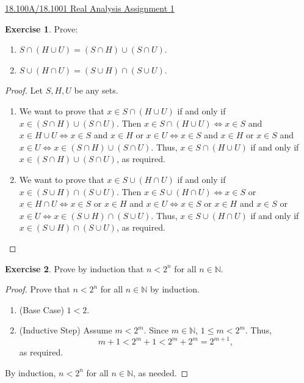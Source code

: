 \documentclass[12pt]{article}
\theoremstyle{definition}
\newtheorem{exercise}{Exercise}
\begin{document}
\uline{18.100A/18.1001 Real Analysis \hfill Assignment 1}

\begin{exercise}
    Prove:
    \begin{enumerate}[label=\alph*)]
        \item $S \cap (H \cup U) = (S \cap H) \cup (S \cap U)$.
        \item $S \cup (H \cap U) = (S \cup H) \cap (S \cup U)$.
    \end{enumerate}
\end{exercise}

\begin{proof}
    Let $S,H,U$ be any sets.
    \begin{enumerate}[label=\alph*)]
        \item We want to prove that $x \in S \cap (H \cup U)$ if and only if $x \in (S \cap H) \cup (S \cap U)$. Then $x \in S \cap (H \cup U) \iff x \in S$ and $x \in H \cup U \iff x \in S$ and $x \in H$ or $x \in U \iff x \in S$ and $x \in H$ or $x \in S$ and $x \in U \iff x \in (S \cap H) \cup (S \cap U)$. Thus, $x \in S \cap (H \cup U)$ if and only if $x \in (S \cap H) \cup (S \cap U)$, as required.
        \item We want to prove that $x \in S \cup (H \cap U)$ if and only if $x \in (S \cup H) \cap (S \cup U)$. Then $x \in S \cup (H \cap U) \iff x \in S$ or $x \in H \cap U \iff x \in S$ or $x \in H$ and $x \in U \iff x \in S$ or $x \in H$ and $x \in S$ or $x \in U \iff x \in (S \cup H) \cap (S \cup U)$. Thus, $x \in S \cup (H \cap U)$ if and only if $x \in (S \cup H) \cap (S \cup U)$, as required.
    \end{enumerate}
\end{proof}

\begin{exercise}
    Prove by induction that $n < 2^n$ for all $n \in \mathbb{N}$.
\end{exercise}

\begin{proof}
    Prove that $n < 2^n$ for all $n \in \mathbb{N}$ by induction.
    \begin{enumerate}[label=\arabic*)]
        \item (Base Case) $1 < 2$.
        \item (Inductive Step) Assume $m < 2^m$. Since $m \in \mathbb{N}$, $1 \leq m < 2^m$. Thus,
        \[
            m + 1 < 2^m + 1 < 2^m + 2^m = 2^{m + 1},
        \]
        as required.
    \end{enumerate}
    By induction, $n < 2^n$ for all $n \in \mathbb{N}$, as needed.
\end{proof}
\end{document}
